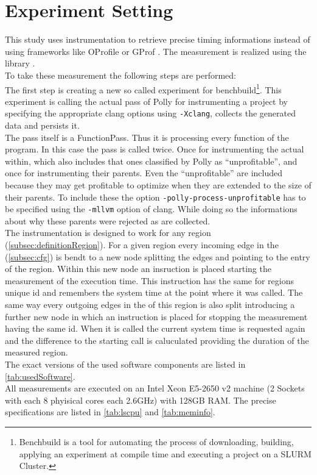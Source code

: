 \section{Experiment Setting}\label{sec:experimentSettings}
\begin{sloppypar}
    This study uses instrumentation to retrieve precise timing informations instead of using frameworks like OProfile \cite{oprofile} or GProf \cite{gprof}.
    The measurement is realized using the \papi library \cite{papi}.\\
    To take these measurement the following steps are performed:\\
    The first step is creating a new so called experiment for benchbuild\footnote{Benchbuild is a tool for automating the process of downloading, building, applying an experiment at compile time and executing a project on a SLURM \cite{slurm} Cluster.}.
    This experiment is calling the actual pass of Polly for instrumenting a project by specifying the appropriate clang options using \texttt{-Xclang}, collects the generated data and persists it.\\
    The pass itself is a FunctionPass.
    Thus it is processing every function of the program.
    In this case the pass is called twice.
    Once for instrumenting the actual \scops within, which also includes that ones classified by Polly as \enquote{unprofitable}, and once for instrumenting their parents.
    Even the \enquote{unprofitable} \scops are included because they may get profitable to optimize when they are extended to the size of their parents.
    To include these \scops the option \texttt{-polly-process-unprofitable} has to be specified using the \texttt{-mllvm} option of clang.
    While doing so the informations about why these parents were rejected as \scops are collected.\\
    The instrumentation is designed to work for any region (\autoref{subsec:definitionRegion}).
    For a given region every incoming edge in the \cfg (\autoref{subsec:cfg}) is bendt to a new node splitting the edges and pointing to the entry of the region.
    Within this new node an insruction is placed starting the measurement of the execution time.
    This instruction has the same for regions unique id and remembers the system time at the point where it was called.
    The same way every outgoing edges in the \cfg of this region is also split introducing a further new node in which an instruction is placed for stopping the measurement having the same id.
    When it is called the current system time is requested again and the difference to the starting call is caluculated providing the duration of the measured region.\\
    The exact versions of the used software components are listed in \autoref{tab:usedSoftware}.\\
    All measurements are executed on an Intel Xeon E5-2650 v2 machine (2 Sockets with each 8 phyisical cores each 2.6GHz) with 128GB RAM.
    The precise specifications are listed in \autoref{tab:lscpu} and \autoref{tab:meminfo}.
\end{sloppypar}
